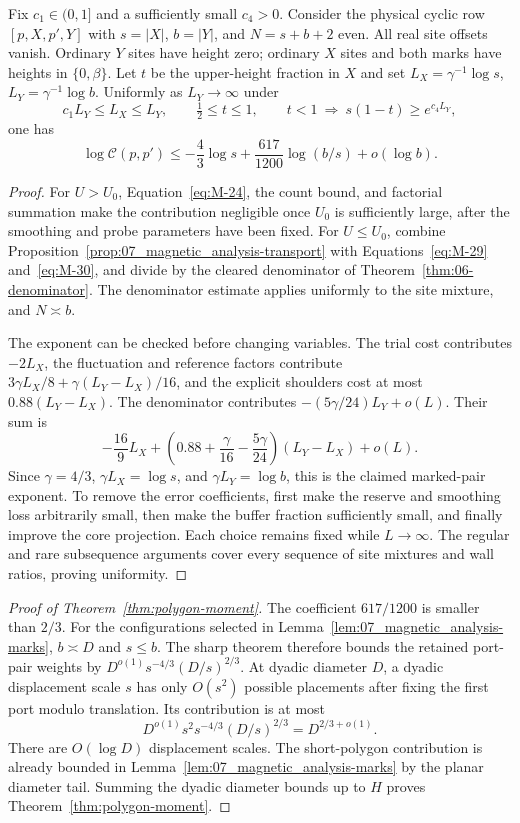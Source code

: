 \begin{theorem}\label{thm:07_magnetic_analysis-moment}
Fix $c_1\in(0,1]$ and a sufficiently small $c_4>0$. Consider the
physical cyclic row $[p,X,p',Y]$ with $s=|X|$, $b=|Y|$, and
$N=s+b+2$ even. All real site offsets vanish. Ordinary $Y$ sites
have height zero; ordinary $X$ sites and both marks have heights in
$\{0,\beta\}$. Let $t$ be the upper-height fraction in $X$ and set
$L_X=\gamma^{-1}\log s$, $L_Y=\gamma^{-1}\log b$.
Uniformly as $L_Y\to\infty$ under
\[
 c_1L_Y\le L_X\le L_Y,\qquad \tfrac12\le t\le1,
 \qquad t<1\ \Longrightarrow\ s(1-t)\ge e^{c_4L_Y},
\]
one has
\[
 \log\mathcal C(p,p')
 \le-\frac43\log s+\frac{617}{1200}\log(b/s)+o(\log b).
\]
\end{theorem}
\begin{proof}
For \(U>U_0\), Equation~\eqref{eq:M-24}, the count bound, and factorial
summation make the contribution negligible once \(U_0\) is sufficiently
large, after the smoothing and probe parameters have been fixed.
For \(U\le U_0\), combine Proposition~\ref{prop:07_magnetic_analysis-transport}
with Equations~\eqref{eq:M-29} and~\eqref{eq:M-30}, and divide by the
cleared denominator of Theorem~\ref{thm:06-denominator}. The denominator estimate
applies uniformly to the site mixture, and \(N\asymp b\).

The exponent can be checked before changing variables. The trial cost
contributes \(-2L_X\), the fluctuation and reference factors contribute
\(3\gamma L_X/8+\gamma(L_Y-L_X)/16\), and the explicit shoulders cost
at most \(0.88(L_Y-L_X)\). The denominator contributes
\(-(5\gamma/24)L_Y+o(L)\). Their sum is
\[
 -\frac{16}{9}L_X+
 \left(0.88+\frac{\gamma}{16}-\frac{5\gamma}{24}\right)(L_Y-L_X)
 +o(L).
\]
Since \(\gamma=4/3\), \(\gamma L_X=\log s\), and
\(\gamma L_Y=\log b\), this is the claimed marked-pair exponent.
To remove the error coefficients, first make the reserve and smoothing
loss arbitrarily small, then make the buffer fraction sufficiently small,
and finally improve the core projection. Each choice remains fixed while
\(L\to\infty\). The regular and rare subsequence arguments cover every
sequence of site mixtures and wall ratios, proving uniformity.

\end{proof}

\begin{proof}[Proof of Theorem~\ref{thm:polygon-moment}]
The coefficient \(617/1200\) is smaller than \(2/3\). For the configurations selected in
Lemma~\ref{lem:07_magnetic_analysis-marks}, $b\asymp D$ and $s\le b$.
The sharp theorem therefore bounds the retained port-pair weights by
\(D^{o(1)}s^{-4/3}(D/s)^{2/3}\). At dyadic diameter \(D\), a dyadic
displacement scale \(s\) has only \(O(s^2)\) possible placements after
fixing the first port modulo translation. Its contribution is at most
\[
 D^{o(1)}s^2s^{-4/3}(D/s)^{2/3}=D^{2/3+o(1)}.
\]
There are \(O(\log D)\) displacement scales. The short-polygon contribution
is already bounded in Lemma~\ref{lem:07_magnetic_analysis-marks} by the
planar diameter tail. Summing the dyadic diameter bounds up to \(H\)
proves Theorem~\ref{thm:polygon-moment}.
\end{proof}
